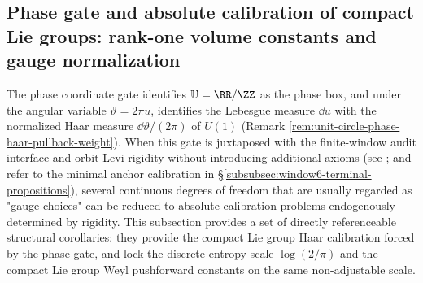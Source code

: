 \subsection{Phase gate and absolute calibration of compact Lie groups: rank-one volume constants and gauge normalization}\label{subsec:unit-circle-phase-compact-lie-normalization}
The phase coordinate gate identifies \(\mathbb{U}=\RR/\ZZ\) as the phase box, and under the angular variable \(\vartheta=2\pi u\), identifies the Lebesgue measure \(\dd u\) with the normalized Haar measure \(\dd\vartheta/(2\pi)\) of \(U(1)\) (Remark \ref{rem:unit-circle-phase-haar-pullback-weight}).
When this gate is juxtaposed with the finite-window audit interface and orbit-Levi rigidity without introducing additional axioms (see \cite{Internal2025ResolutionFoldingPhiPi}; and refer to the minimal anchor calibration in \S\ref{subsubsec:window6-terminal-propositions}), several continuous degrees of freedom that are usually regarded as "gauge choices" can be reduced to absolute calibration problems endogenously determined by rigidity.
This subsection provides a set of directly referenceable structural corollaries: they provide the compact Lie group Haar calibration forced by the phase gate, and lock the discrete entropy scale \(\log(2/\pi)\) and the compact Lie group Weyl pushforward constants on the same non-adjustable scale.
\par

